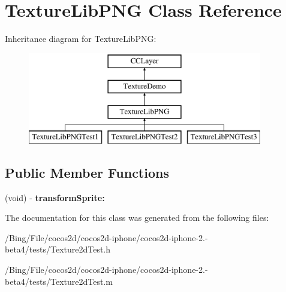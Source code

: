 \hypertarget{interface_texture_lib_p_n_g}{\section{Texture\-Lib\-P\-N\-G Class Reference}
\label{interface_texture_lib_p_n_g}
}
Inheritance diagram for Texture\-Lib\-P\-N\-G\-:\begin{figure}[H]
\begin{center}
\leavevmode
\includegraphics[height=4.000000cm]{interface_texture_lib_p_n_g}
\end{center}
\end{figure}
\subsection*{Public Member Functions}
\begin{DoxyCompactItemize}
\item 
\hypertarget{interface_texture_lib_p_n_g_ae0433a304e51b38700b97bbc247836e6}{(void) -\/ {\bfseries transform\-Sprite\-:}}\label{interface_texture_lib_p_n_g_ae0433a304e51b38700b97bbc247836e6}

\end{DoxyCompactItemize}


The documentation for this class was generated from the following files\-:\begin{DoxyCompactItemize}
\item 
/\-Bing/\-File/cocos2d/cocos2d-\/iphone/cocos2d-\/iphone-\/2.-\/beta4/tests/Texture2d\-Test.\-h\item 
/\-Bing/\-File/cocos2d/cocos2d-\/iphone/cocos2d-\/iphone-\/2.-\/beta4/tests/Texture2d\-Test.\-m\end{DoxyCompactItemize}
